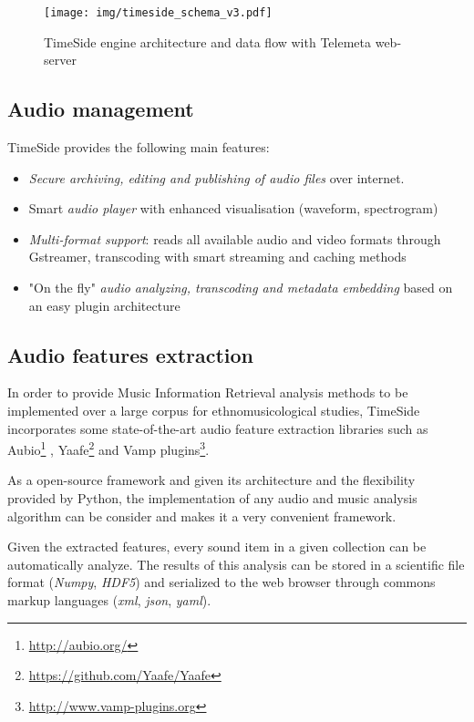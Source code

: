 \documentclass{paper}
\begin{document}
\begin{figure*}[htbp]
  \centering
  \texttt{[image: img/timeside\_schema\_v3.pdf]}
  \caption{TimeSide engine architecture and data flow with Telemeta web-server}\label{fig:TimeSide_Archi}
\end{figure*}


\subsection{Audio management}
TimeSide provides the following main features:
\begin{itemize}
\item \emph{Secure archiving, editing and publishing of audio files} over
  internet.
\item Smart \emph{audio player} with enhanced visualisation (waveform, spectrogram)
\item \emph{Multi-format support}: reads all available audio and video formats  through Gstreamer, transcoding with smart streaming and caching methods%
\item "On the fly" \emph{audio analyzing, transcoding and metadata
    embedding} based on an easy plugin architecture
\end{itemize}

\subsection{Audio features extraction}
In order to provide Music Information Retrieval analysis methods to be implemented over a large corpus for ethnomusicological studies, TimeSide incorporates some state-of-the-art audio feature extraction libraries such as Aubio\footnote{\url{http://aubio.org/}} \citep{brossierPhD}, Yaafe\footnote{\url{https://github.com/Yaafe/Yaafe}} \citep{yaafe_ISMIR2010} and Vamp plugins\footnote{ \url{http://www.vamp-plugins.org}}.

As a open-source framework and given its architecture and the flexibility provided by Python, the implementation of any audio and music analysis algorithm can be consider and makes it a very convenient framework.

Given the extracted features, every sound item in a given collection can be automatically analyze. The results of this analysis can be stored in a scientific file format (\emph{Numpy}, \emph{HDF5}) and serialized to the web browser through commons markup languages (\emph{xml}, \emph{json}, \emph{yaml}).
\end{document}
